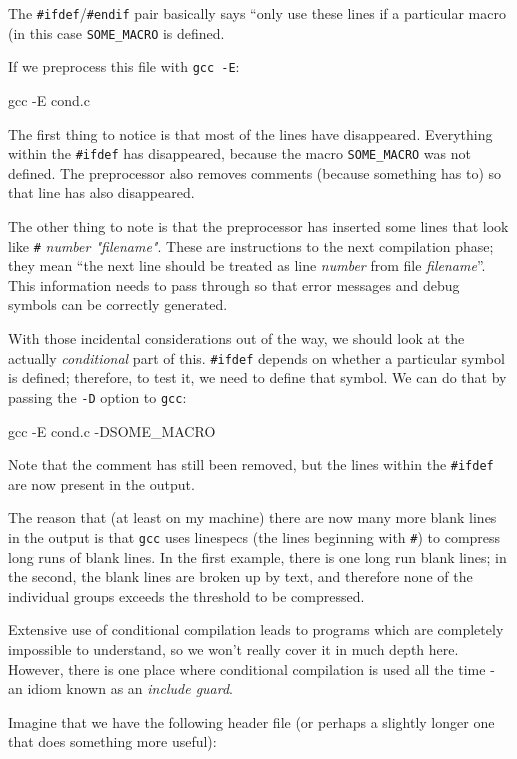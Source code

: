 \documentclass[a4paper,10pt]{article}
\newcommand{\kw}[1]{\texttt{#1}}
\newcommand{\tool}[1]{\texttt{#1}}
\begin{document}
The \verb!#ifdef!/\verb!#endif! pair basically says ``only use these
lines if a particular macro (in this case \kw{SOME\_MACRO} is defined.

If we preprocess this file with \tool{gcc -E}:

gcc -E cond.c
\END

\noindent
The first thing to notice is that most of the lines have
disappeared. Everything within the \verb!#ifdef! has disappeared,
because the macro \kw{SOME\_MACRO} was not defined. The preprocessor
also removes comments (because something has to) so that line has also
disappeared.

The other thing to note is that the preprocessor has inserted some
lines that look like \verb!#! \textit{number "filename"}. These are
instructions to the next compilation phase; they mean ``the next line
should be treated as line \textit{number} from file
\textit{filename}''. This information needs to pass through so that
error messages and debug symbols can be correctly generated.

With those incidental considerations out of the way, we should look at
the actually \emph{conditional} part of this. \verb!#ifdef! depends on
whether a particular symbol is defined; therefore, to test it, we need
to define that symbol. We can do that by passing the \tool{-D} option
to \tool{gcc}:

gcc -E cond.c -DSOME_MACRO
\END

\noindent
Note that the comment has still been removed, but the lines within the
\verb!#ifdef! are now present in the output.

The reason that (at least on my machine) there are now many more blank
lines in the output is that \tool{gcc} uses linespecs (the lines
beginning with \verb!#!) to compress long runs of blank lines. In the
first example, there is one long run blank lines; in the second, the
blank lines are broken up by text, and therefore none of the
individual groups exceeds the threshold to be compressed.

Extensive use of conditional compilation leads to programs which are
completely impossible to understand, so we won't really cover it in
much depth here. However, there is one place where conditional
compilation is used all the time - an idiom known as an \emph{include
  guard}.

Imagine that we have the following header file (or perhaps a slightly
longer one that does something more useful):
\end{document}
